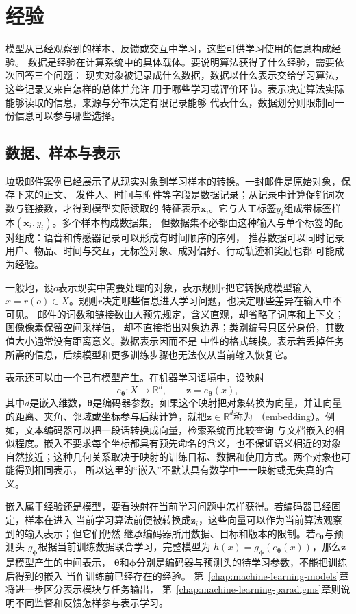 \section{经验}
\label{sec:machine-learning-data}

模型从已经观察到的样本、反馈或交互中学习，这些可供学习使用的信息构成经验。
数据是经验在计算系统中的具体载体。要说明算法获得了什么经验，需要依次回答三个问题：
现实对象被记录成什么数据，数据以什么表示交给学习算法，这些记录又来自怎样的总体并允许
用于哪些学习或评价环节。表示决定算法实际能够读取的信息，来源与分布决定有限记录能够
代表什么，数据划分则限制同一份信息可以参与哪些选择。

\subsection{数据、样本与表示}
\label{sec:experience-data-representation}

垃圾邮件案例已经展示了从现实对象到学习样本的转换。一封邮件是原始对象，保存下来的正文、
发件人、时间与附件等字段是数据记录；从记录中计算促销词次数与链接数，才得到模型实际读取的
特征表示$\bm{x}_i$。它与人工标签$y_i$组成带标签样本$(\bm{x}_i,y_i)$。多个样本构成数据集，
但数据集不必都由这种输入与单个标签的配对组成：语音和传感器记录可以形成有时间顺序的序列，
推荐数据可以同时记录用户、物品、时间与交互，无标签对象、成对偏好、行动轨迹和奖励也都
可能成为经验。

一般地，设$o$表示现实中需要处理的对象，表示规则$r$把它转换成模型输入
$x=r(o)\in X$。规则$r$决定哪些信息进入学习问题，也决定哪些差异在输入中不可见。
邮件的词数和链接数由人预先规定，含义直观，却省略了词序和上下文；图像像素保留空间采样值，
却不直接指出对象边界；类别编号只区分身份，其数值大小通常没有距离意义。数据表示因而不是
中性的格式转换。表示若丢掉任务所需的信息，后续模型和更多训练步骤也无法仅从当前输入恢复它。

表示还可以由一个已有模型产生。在机器学习语境中，设映射
\[
  e_{\bm{\theta}}:X\to\mathbb{R}^d,\qquad
  \bm{z}=e_{\bm{\theta}}(x),
\]
其中$d$是嵌入维数，$\bm{\theta}$是编码器参数。如果这个映射把对象转换为向量，并让向量
的距离、夹角、邻域或坐标参与后续计算，就把$\bm{z}\in\mathbb{R}^d$称为
（embedding）。例如，文本编码器可以把一段话转换成向量，检索系统再比较查询
与文档嵌入的相似程度。嵌入不要求每个坐标都具有预先命名的含义，也不保证语义相近的对象
自然接近；这种几何关系取决于映射的训练目标、数据和使用方式。两个对象也可能得到相同表示，
所以这里的“嵌入”不默认具有数学中一一映射或无失真的含义。

嵌入属于经验还是模型，要看映射在当前学习问题中怎样获得。若编码器已经固定，样本在进入
当前学习算法前便被转换成$\bm z_i$，这些向量可以作为当前算法观察到的输入表示；但它们仍然
继承编码器所用数据、目标和版本的限制。若$e_{\bm{\theta}}$与预测头
$g_{\bm{\phi}}$根据当前训练数据联合学习，完整模型为
$h(x)=g_{\bm{\phi}}(e_{\bm{\theta}}(x))$，那么$\bm{z}$是模型产生的中间表示，
$\bm{\theta}$和$\bm{\phi}$分别是编码器与预测头的待学习参数，不能把训练后得到的嵌入
当作训练前已经存在的经验。
第~\ref{chap:machine-learning-models}章将进一步区分表示模块与任务输出，
第~\ref{chap:machine-learning-paradigms}章则说明不同监督和反馈怎样参与表示学习。

